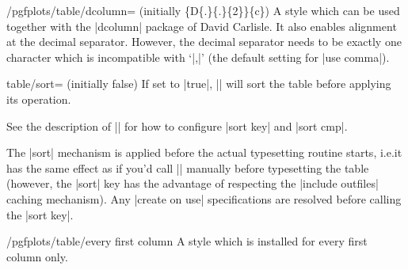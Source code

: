 \begin{stylekey}{/pgfplots/table/dcolumn= (initially \{D\{.\}\{.\}\{2\}\}\{c\})}
    A style which can be used together with the |dcolumn| package of David
    Carlisle. It also enables alignment at the decimal separator. However, the
    decimal separator needs to be exactly one character which is incompatible
    with `|{,}|' (the default setting for |use comma|).
\end{stylekey}

\begin{pgfplotskey}{table/sort= (initially false)}
    If set to |true|, |\pgfplotstabletypeset| will sort the table before
    applying its operation.

    See the description of |\pgfplotstablesort| for how to configure |sort key|
    and |sort cmp|.
\begin{codeexample}[pre={\begin{lateximage}},post={\end{lateximage}}]
\end{codeexample}

    The |sort| mechanism is applied before the actual typesetting routine
    starts, i.e.\@ it has the same effect as if you'd call |\pgfplotstablesort|
    manually before typesetting the table (however, the |sort| key has the
    advantage of respecting the |include outfiles| caching mechanism). Any
    |create on use| specifications are resolved before calling the |sort key|.

\end{pgfplotskey}

\begin{stylekey}{/pgfplots/table/every first column}
    A style which is installed for every first column only.
\begin{codeexample}[pre={\begin{lateximage}},post={\end{lateximage}},narrow]
\end{codeexample}
\end{stylekey}

